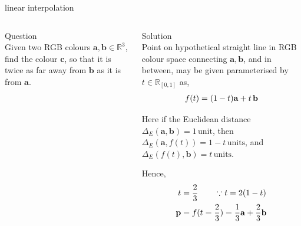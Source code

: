 \documentclass[aspectratio=169,xcolor={dvipsnames,svgnames}]{beamer}
\begin{document}
\begin{frame}[label={sec:org52c6c27}]{linear interpolation}
\begin{columns}
\begin{column}{.3\columnwidth}
\alert{Question} \\[0pt]
Given two RGB colours \(\mathbf{a},\mathbf{b} \in
\mathbb{R}^3\), find the colour \(\mathbf{c}\), so that it
is twice as far away from \(\mathbf{b}\) as it is from
\(\mathbf{a}\).
\end{column}

\begin{column}{.7\columnwidth}
\alert{Solution} \\[0pt]
Point on hypothetical straight line in RGB colour space
connecting \(\mathbf{a},\mathbf{b}\), and in between, may
be given parameterised by \(t\in\mathbb{R}_{[0,1]}\) as,
\begin{align}
  \notag
  f(t) = (1-t)\mathbf{a} + t\,\mathbf{b}
\end{align}

Here if the Euclidean distance \(\Delta_E (\mathbf{a},
\mathbf{b}) = 1\,\mathrm{unit}\), then \(\Delta_E
(\mathbf{a}, f(t)) = 1-t\,\mathrm{units}\), and
\(\Delta_E (f(t), \mathbf{b}) = t\,\mathrm{units}\).

Hence,
\begin{align}
  \notag
  t &= \frac23 \qquad \because t = 2(1-t) \\
  \notag
  \mathbf{p} &= f(t=\frac23) =
               \frac13\mathbf{a} + \frac23\mathbf{b}
\end{align}
\end{column}
\end{columns}
\end{frame}
\end{document}
